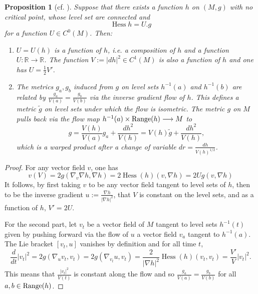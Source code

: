 \documentclass[11pt]{article}
\newtheorem{proposition}[theorem]{Proposition}
\DeclareMathOperator{\hess}{Hess}
\begin{document}
\begin{proposition}[cf. \cite{Cheeger.Colding96_LowerBoundsRicci}]
\label{prop:cheeger-colding}
Suppose that there exists a function \(h\) on \((M,g)\) with no critical point,
whose level set are connected and 
\begin{equation}
\label{eq:xi}
\hess h = U.g
\end{equation}
for a function \(U\in C^0(M)\). Then:
\begin{enumerate}
\item \(U=U(h)\) is a function of \(h\), i.e. a composition of \(h\) and a function \(U:
   \mathbb{R}\longrightarrow \mathbb{R}\). The function \(V:= |dh|^2\in C^1(M)\) is
also a function of \(h\) and one has \(U = \frac{1}{2}V'\).
\item The metrics \(g_a, g_b\) induced from \(g\) on level sets \(h^{-1}(a)\) and \(h^{-1}(b)\) are related
by \(\frac{g_a}{V(a)}= \frac{g_b}{V(b)}\) via the inverse gradient flow of \(h\). 
This defines a metric \(\tilde g\) on level sets under which the flow is isometric. 
The metric \(g\) on \(M\) pulls back
via the flow map \(h^{-1}(a)\times {\rm Range}(h) \longrightarrow M\) to
\[
    g = \frac{V(h)}{V(a)}g_a + \frac{dh^2}{V(h)} = V(h)\tilde g + \frac{dh^2}{V(h)},
   \]
which is a warped product after a change of variable \(dr = \frac{dh}{V(h)^{1/2}}\).
\end{enumerate}
\end{proposition}

\begin{proof}
For any vector field \(v\), one has 
\[
 v(V) = 2 g(\nabla_v \nabla h, \nabla h)= 2 \hess(h)(v, \nabla h) = 2U g(v, \nabla h)
\]
It follows, by first taking \(v\) to be any vector field tangent to level
sets of \(h\), then to be the inverse gradient \(u:= \frac{\nabla h}{|\nabla h|^2}\), that
\(V\) is constant on the level sets, and as a function of \(h\), \(V' = 2U\).

For the second part, let \(v_t\) be a vector field of \(M\) tangent to level sets \(h^{-1}(t)\) given by 
pushing forward via the flow of \(u\) a vector field \(v_a\) tangent to \(h^{-1}(a)\). The Lie bracket \([v_t, u]\)
vanishes by definition and for all time \(t\),
\[
 \frac{d}{dt}|v_t|^2 = 2 g(\nabla_u v_t, v_t) = 2 g(\nabla_{v_t}u, v_t) =
\frac{2}{|\nabla h|^2}\hess(h)(v_t, v_t) = \frac{V'}{V}|v_t|^2.
\]
This means that \(\frac{|v_t|^2}{V(t)}\) is constant along the flow and so \(\frac{g_a}{V(a)} = \frac{g_b}{V(b)}\) for all \(a,b\in {\rm Range}(h)\).
\end{proof}
\end{document}

